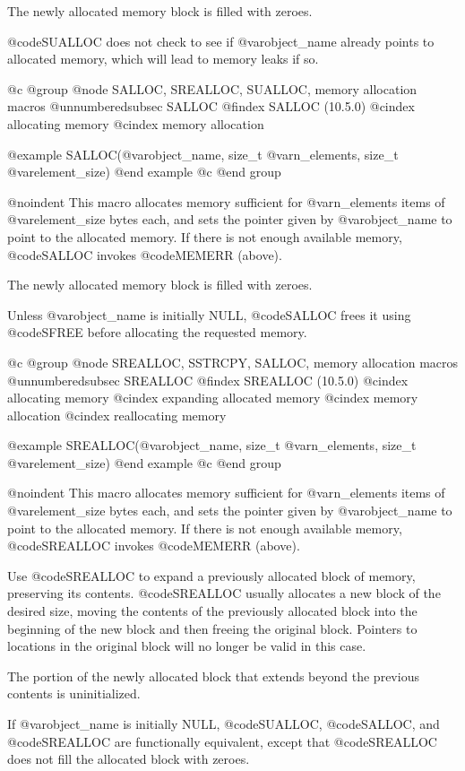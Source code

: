 {{{{{{{{{The newly allocated memory block is filled with zeroes.

@code{SUALLOC} does not check to see if @var{object_name} already points to
allocated memory, which will lead to memory leaks if so.

@c @group
@node     SALLOC, SREALLOC, SUALLOC, memory allocation macros
@unnumberedsubsec SALLOC
@findex SALLOC (10.5.0)
@cindex allocating memory
@cindex memory allocation

@example
SALLOC(@var{object_name}, size_t @var{n_elements}, size_t @var{element_size})
@end example
@c @end group

@noindent
This macro allocates memory sufficient for @var{n_elements} items of
@var{element_size} bytes each, and sets the pointer given by @var{object_name}
to point to the allocated memory.  If there is not enough available memory,
@code{SALLOC} invokes @code{MEMERR} (above).

The newly allocated memory block is filled with zeroes.

Unless @var{object_name} is initially NULL, @code{SALLOC} frees it using
@code{SFREE} before allocating the requested memory.

@c @group
@node     SREALLOC, SSTRCPY, SALLOC, memory allocation macros
@unnumberedsubsec SREALLOC
@findex SREALLOC (10.5.0)
@cindex allocating memory
@cindex expanding allocated memory
@cindex memory allocation
@cindex reallocating memory

@example
SREALLOC(@var{object_name}, size_t @var{n_elements}, size_t @var{element_size})
@end example
@c @end group

@noindent
This macro allocates memory sufficient for @var{n_elements} items of
@var{element_size} bytes each, and sets the pointer given by @var{object_name}
to point to the allocated memory.  If there is not enough available memory,
@code{SREALLOC} invokes @code{MEMERR} (above).

Use @code{SREALLOC} to expand a previously allocated block of memory,
preserving its contents.  @code{SREALLOC} usually allocates a new block of the
desired size, moving the contents of the previously allocated block into
the beginning of the new block and then freeing the original block.  Pointers
to locations in the original block will no longer be valid in this case.

The portion of the newly allocated block that extends beyond the previous
contents is uninitialized.

If @var{object_name} is initially NULL, @code{SUALLOC}, @code{SALLOC}, and
@code{SREALLOC} are functionally equivalent, except that @code{SREALLOC} does
not fill the allocated block with zeroes.

}}}}}}}}}
